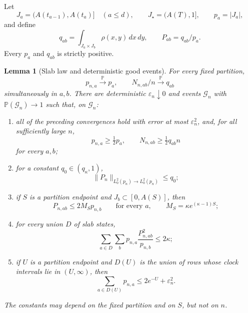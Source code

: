 \documentclass[11pt]{article}
\newtheorem{lemma}[theorem]{Lemma}
\theoremstyle{remark}
\newcommand{\Pp}{\mathbb P}
\newcommand{\dd}{\,d}
\begin{document}
Let
\[
 J_a=(A(t_{a-1}),A(t_a)]\quad(a\le d),
 \qquad J_\star=(A(T),1],
 \qquad p_a=|J_a|,
\]
and define
\[
 q_{ab}=\int_{J_a\times J_b}\rho(x,y)\dd x\dd y,
 \qquad P_{ab}=q_{ab}/p_a.
\]
Every $p_a$ and $q_{ab}$ is strictly positive.

\begin{lemma}[Slab law and deterministic good events]
\label{lem:pd-slab-law}
For every fixed partition,
\[
        p_{n,a}\xrightarrow{\Pp}p_a,
        \qquad N_{n,ab}/n\xrightarrow{\Pp}q_{ab}
\]
simultaneously in $a,b$.  There are deterministic $\varepsilon_n\downarrow0$
and events $\mathcal G_n$ with $\Pp(\mathcal G_n)\to1$ such that, on
$\mathcal G_n$:
\begin{enumerate}[label=(\roman*)]
\item all of the preceding convergences hold with error at most
$\varepsilon_n^2$, and, for all sufficiently large $n$,
\[
        p_{n,a}\ge\tfrac12p_a,
        \qquad N_{n,ab}\ge\tfrac12q_{ab}n
\]
for every $a,b$;
\item for a constant $q_0\in(q_\kappa,1)$,
\[
        \|P_n\|_{L^2_0(p_n)\to L^2_0(p_n)}\le q_0;
\]
\item if $S$ is a partition endpoint and $J_b\subset[0,A(S)]$, then
\[
        P_{n,ab}\le 2M_Sp_{n,b}\qquad\text{for every }a,
        \qquad M_S=\kappa e^{(\kappa-1)S};
        \tag{6.1}
\]
\item for every union $D$ of slab states,
\[
 \sum_{a\in D}\sum_b p_{n,a}\frac{P_{n,ab}^2}{p_{n,b}}
 \le2\kappa;
        \tag{6.2}
\]
\item if $U$ is a partition endpoint and $D(U)$ is the union of rows whose
clock intervals lie in $(U,\infty)$, then
\[
        \sum_{a\in D(U)}p_{n,a}\le2e^{-U}+\varepsilon_n^2.
        \tag{6.3}
\]
\end{enumerate}
The constants may depend on the fixed partition and on $S$, but not on $n$.
\end{lemma}
\end{document}
